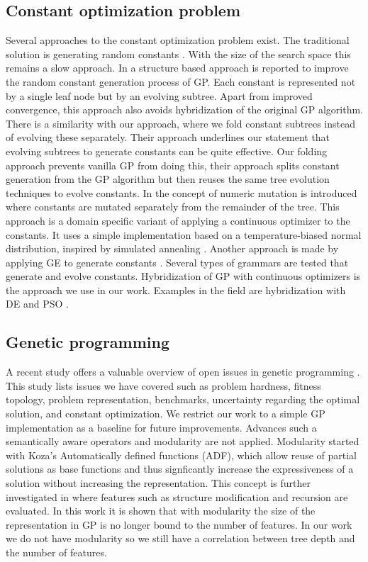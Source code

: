 \subsection{Constant optimization problem}
Several approaches to the constant optimization problem exist. The traditional solution is generating random constants \citep{GP}. With the size of the search space this remains a slow approach.
In \citep{GPConstAlter} a structure based approach is reported to improve the random constant generation process of GP. Each constant is represented not by a single leaf node but by an evolving subtree. Apart from improved convergence, this approach also avoids hybridization of the original GP algorithm. There is a similarity with our approach, where we fold constant subtrees instead of evolving these separately. Their approach underlines our statement that evolving subtrees to generate constants can be quite effective. Our folding approach prevents vanilla GP from doing this, their approach splits constant generation from the GP algorithm but then reuses the same tree evolution techniques to evolve constants.
In \citep{GPConst} the concept of numeric mutation is introduced where constants are mutated separately from the remainder of the tree. This approach is a domain specific variant of applying a continuous optimizer to the constants. It uses a simple implementation based on a temperature-biased normal distribution, inspired by simulated annealing \citep{SA}.
Another approach is made by applying GE to generate constants \citep{GPConstGE}. Several types of grammars are tested that generate and evolve constants.
Hybridization of GP with continuous optimizers is the approach we use in our work. Examples in the field are hybridization with DE \citep{GPDE} and PSO \citep{SRBaseline}.


\subsection{Genetic programming}
A recent study offers a valuable overview of open issues in genetic programming \citep{GPIssues}. This study lists issues we have covered such as problem hardness, fitness topology, problem representation, benchmarks, uncertainty regarding the optimal solution, and constant optimization.
We restrict our work to a simple GP implementation as a baseline for future improvements. Advances such a semantically aware operators \citep {GPSemantics} and modularity are not applied. Modularity started with Koza's \cite{GP} Automatically defined functions (ADF), which allow reuse of partial solutions as base functions and thus signficantly increase the expressiveness of a solution without increasing the representation. This concept is further investigated in \citep{GPModularity} where features such as structure modification and recursion are evaluated. In this work it is shown that with modularity the size of the representation in GP is no longer bound to the number of features. In our work we do not have modularity so we still have a correlation between tree depth and the number of features.

